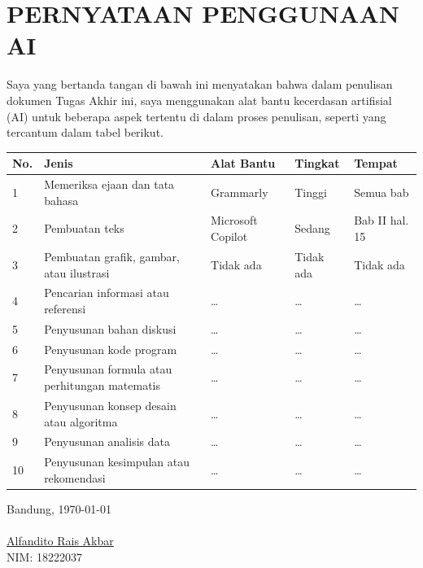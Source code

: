 \chapter*{PERNYATAAN PENGGUNAAN AI}
Saya yang bertanda tangan di bawah ini menyatakan bahwa dalam penulisan dokumen Tugas Akhir ini,
saya menggunakan alat bantu kecerdasan artifisial (AI) untuk beberapa aspek tertentu di dalam proses penulisan,
seperti yang tercantum dalam tabel berikut.
\begin{table}[h]
\begin{tabular}{|p{0.5cm}| p{4cm} | p{2.5cm} | p{2.5cm} | p{3cm} @{}| }
\hline
\textbf{No.} & \textbf{Jenis} & \textbf{Alat Bantu} & \textbf{Tingkat} & \textbf{Tempat}\\
\hline
1 & Memeriksa ejaan dan tata bahasa & Grammarly & Tinggi & Semua bab \\
\hline
2 & Pembuatan teks & Microsoft Copilot & Sedang & Bab II hal. 15 \\
\hline
3 & Pembuatan grafik, gambar, atau ilustrasi & Tidak ada & Tidak ada & Tidak ada \\
\hline
4 & Pencarian informasi atau referensi & \ldots & \ldots & \ldots \\
\hline
5 & Penyusunan bahan diskusi & \ldots & \ldots & \ldots \\
\hline
6 & Penyusunan kode program & \ldots & \ldots & \ldots \\
\hline
7 & Penyusunan formula atau perhitungan matematis & \ldots & \ldots & \ldots \\
\hline
8 & Penyusunan konsep desain atau algoritma & \ldots & \ldots & \ldots \\
\hline
9 & Penyusunan analisis data & \ldots & \ldots & \ldots \\
\hline
10 & Penyusunan kesimpulan atau rekomendasi & \ldots & \ldots & \ldots \\
\hline
\end{tabular}
\end{table}


Bandung, \today\\
\\[2cm]

\underline{Alfandito Rais Akbar} \\
NIM: 18222037